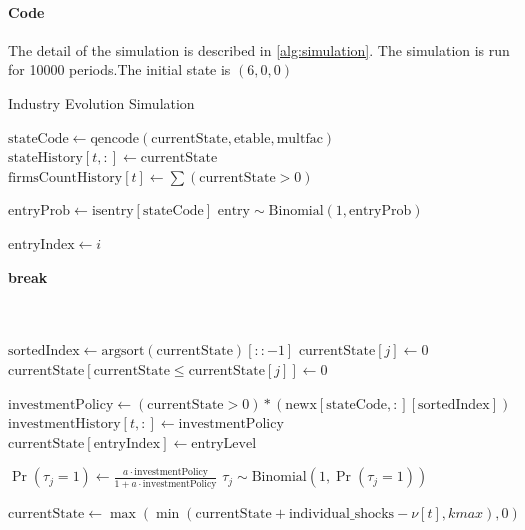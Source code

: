 \documentclass[12pt]{article}[margin=1in]
\begin{document}
\paragraph{Code} The detail of the simulation is described in \ref{alg:simulation}. The simulation is run for 10000 periods.The initial state is $(6,0,0)$
\begin{algorithm}
    \caption{Industry Evolution Simulation}
    \begin{algorithmic}[1]
        \State $\text{stateCode} \gets \text{qencode}(\text{currentState}, \text{etable}, \text{multfac})$
        \State $\text{stateHistory}[t, :] \gets \text{currentState}$
        \State $\text{firmsCountHistory}[t] \gets \sum (\text{currentState} > 0)$

        \State $\text{entryProb} \gets \text{isentry}[\text{stateCode}]$
        \State $\text{entry} \sim \text{Binomial}(1, \text{entryProb})$

        \State $\text{entryIndex} \gets i$
        \EndIf

        \State \textbf{break}
        \EndIf
        \EndFor

        \\
        \\
        \State $\text{sortedIndex} \gets \text{argsort} (\text{currentState})[::-1]$
        \State $\text{currentState}[j] \gets 0$
        \State $\text{currentState}[\text{currentState} \leq \text{currentState}[j]] \gets 0$
        \EndIf
        \EndFor

        \State $\text{investmentPolicy} \gets (\text{currentState} > 0) * (\text{newx}[\text{stateCode}, :][\text{sortedIndex}])$
        \State $\text{investmentHistory}[t, :] \gets \text{investmentPolicy}$
        \State $\text{currentState}[\text{entryIndex}] \gets \text{entryLevel}$
        \EndIf

        \State $\Pr(\tau_j = 1) \gets \frac{a \cdot \text{investmentPolicy}}{1 + a \cdot \text{investmentPolicy}}$
        \State $\tau_j \sim \text{Binomial}(1, \Pr(\tau_j = 1))$

        \State $\text{currentState} \gets \max(\min(\text{currentState} + \text{individual\_shocks} - \nu[t], kmax), 0)$
        \EndFor
    \end{algorithmic}
    \label{alg:simulation}
\end{algorithm}
\end{document}

